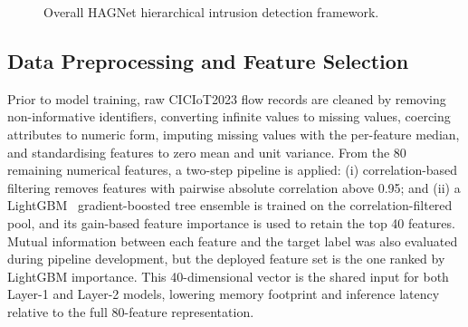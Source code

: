 \documentclass{llncs}
\begin{document}
\begin{figure}[!htb]
\centering
{}
\caption{Overall HAGNet hierarchical intrusion detection framework.}
\label{fig:architecture}
\end{figure}

\subsection{Data Preprocessing and Feature Selection}

Prior to model training, raw CICIoT2023 flow records are cleaned by removing non-informative identifiers, converting infinite values to missing values, coercing attributes to numeric form, imputing missing values with the per-feature median, and standardising features to zero mean and unit variance. From the 80 remaining numerical features, a two-step pipeline is applied: (i) correlation-based filtering removes features with pairwise absolute correlation above 0.95; and (ii) a LightGBM~\cite{ref14} gradient-boosted tree ensemble is trained on the correlation-filtered pool, and its gain-based feature importance is used to retain the top 40 features. Mutual information between each feature and the target label was also evaluated during pipeline development, but the deployed feature set is the one ranked by LightGBM importance. This 40-dimensional vector is the shared input for both Layer-1 and Layer-2 models, lowering memory footprint and inference latency relative to the full 80-feature representation.
\end{document}

